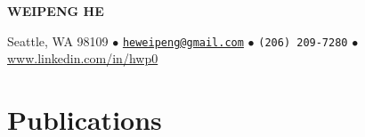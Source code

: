 \documentclass[a4paper,9pt]{extarticle} %
\begin{document}
\thispagestyle{empty}


\begin{center}
  {\Huge\bfseries\sffamily WEIPENG HE}

  Seattle, WA 98109 $\bullet$
  \href{mailto:heweipeng@gmail.com}{\texttt{heweipeng@gmail.com}} $\bullet$
  \texttt{(206) 209-7280} $\bullet$
  \url{www.linkedin.com/in/hwp0} 
\end{center}



\section{Publications}
\end{document}
